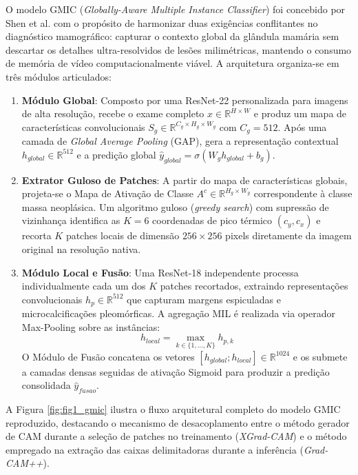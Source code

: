 \documentclass[12pt]{article}
\begin{document}
O modelo GMIC (\textit{Globally-Aware Multiple Instance Classifier}) foi concebido por Shen et al. \cite{shen2021interpretable} com o propósito de harmonizar duas exigências conflitantes no diagnóstico mamográfico: capturar o contexto global da glândula mamária sem descartar os detalhes ultra-resolvidos de lesões milimétricas, mantendo o consumo de memória de vídeo computacionalmente viável. A arquitetura organiza-se em três módulos articulados:

\begin{enumerate}
    \item \textbf{Módulo Global}: Composto por uma ResNet-22 personalizada para imagens de alta resolução, recebe o exame completo $x \in \mathbb{R}^{H \times W}$ e produz um mapa de características convolucionais $S_g \in \mathbb{R}^{C_g \times H_g \times W_g}$ com $C_g = 512$. Após uma camada de \textit{Global Average Pooling} (GAP), gera a representação contextual $h_{global} \in \mathbb{R}^{512}$ e a predição global $\hat{y}_{global} = \sigma(W_g h_{global} + b_g)$.
    
    \item \textbf{Extrator Guloso de Patches}: A partir do mapa de características globais, projeta-se o Mapa de Ativação de Classe $A^c \in \mathbb{R}^{H_g \times W_g}$ correspondente à classe massa neoplásica. Um algoritmo guloso (\textit{greedy search}) com supressão de vizinhança identifica as $K=6$ coordenadas de pico térmico $(c_y, c_x)$ e recorta $K$ patches locais de dimensão $256 \times 256$ pixels diretamente da imagem original na resolução nativa.
    
    \item \textbf{Módulo Local e Fusão}: Uma ResNet-18 independente processa individualmente cada um dos $K$ patches recortados, extraindo representações convolucionais $h_p \in \mathbb{R}^{512}$ que capturam margens espiculadas e microcalcificações pleomórficas. A agregação MIL é realizada via operador Max-Pooling sobre as instâncias:
    \begin{equation}
    h_{local} = \max_{k \in \{1, \dots, K\}} h_{p,k}
    \end{equation}
    O Módulo de Fusão concatena os vetores $[h_{global}; h_{local}] \in \mathbb{R}^{1024}$ e os submete a camadas densas seguidas de ativação Sigmoid para produzir a predição consolidada $\hat{y}_{fusao}$.
\end{enumerate}

A Figura \ref{fig:fig1_gmic} ilustra o fluxo arquitetural completo do modelo GMIC reproduzido, destacando o mecanismo de desacoplamento entre o método gerador de CAM durante a seleção de patches no treinamento (\textit{XGrad-CAM}) e o método empregado na extração das caixas delimitadoras durante a inferência (\textit{Grad-CAM++}).
\end{document}
